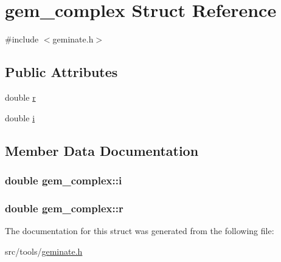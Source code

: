 \hypertarget{structgem__complex}{\section{gem\-\_\-complex \-Struct \-Reference}
\label{structgem__complex}
}


{\ttfamily \#include $<$geminate.\-h$>$}

\subsection*{\-Public \-Attributes}
\begin{DoxyCompactItemize}
\item 
double \hyperlink{structgem__complex_a6d55caf23a8aac3a86c900d23727946f}{r}
\item 
double \hyperlink{structgem__complex_af7f97f625ea81d5e2620d93616b8f903}{i}
\end{DoxyCompactItemize}


\subsection{\-Member \-Data \-Documentation}
\hypertarget{structgem__complex_af7f97f625ea81d5e2620d93616b8f903}{
\subsubsection[{i}]{\setlength{\rightskip}{0pt plus 5cm}double {\bf gem\-\_\-complex\-::i}}}\label{structgem__complex_af7f97f625ea81d5e2620d93616b8f903}
\hypertarget{structgem__complex_a6d55caf23a8aac3a86c900d23727946f}{
\subsubsection[{r}]{\setlength{\rightskip}{0pt plus 5cm}double {\bf gem\-\_\-complex\-::r}}}\label{structgem__complex_a6d55caf23a8aac3a86c900d23727946f}


\-The documentation for this struct was generated from the following file\-:\begin{DoxyCompactItemize}
\item 
src/tools/\hyperlink{geminate_8h}{geminate.\-h}\end{DoxyCompactItemize}
